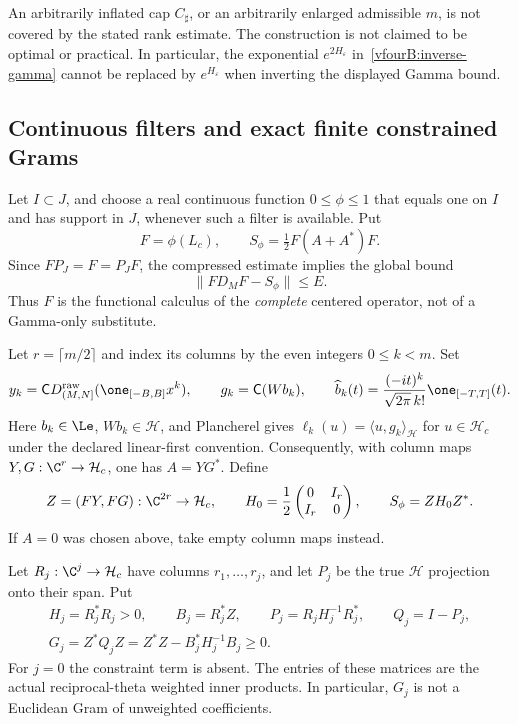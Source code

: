 \documentclass[11pt,a4paper]{article}
\numberwithin{equation}{section}
\theoremstyle{definition}\newtheorem{definition}[theorem]{Definition}
\theoremstyle{remark}\newtheorem{remark}[theorem]{Remark}
\newcommand{\Hh}{\mathcal H}\newcommand{\Hw}{\mathcal H}
\newcommand{\ip}[2]{\langle#1,#2\rangle}\newcommand{\norm}[1]{\lVert#1\rVert}\newcommand{\abs}[1]{\lvert#1\rvert}
\begin{document}
An arbitrarily inflated cap $C_\sharp$, or an arbitrarily enlarged
admissible $m$, is not covered by the stated rank estimate. The construction
is not claimed to be optimal or practical. In particular, the exponential
$e^{2H_\varepsilon}$ in~\eqref{vfourB:inverse-gamma} cannot be replaced by
$e^{H_\varepsilon}$ when inverting the displayed Gamma bound.

\subsection{Continuous filters and exact finite constrained Grams}
\label{vfourB:gram-section}

Let $I\subset J$, and choose a real continuous function $0\le\phi\le1$
that equals one on $I$ and has support in $J$, whenever such a filter is
available. Put
\begin{equation}\label{vfourB:filtered-operator}
 F=\phi(L_c),\qquad S_\phi=\tfrac12 F(A+A^*)F.
\end{equation}
Since $FP_J=F=P_JF$, the compressed estimate implies the global bound
\begin{equation}\label{vfourB:filtered-error}
 \norm{FD_MF-S_\phi}\le E.
\end{equation}
Thus $F$ is the functional calculus of the \emph{complete} centered
operator, not of a Gamma-only substitute.

Let $r=\lceil m/2\rceil$ and index its columns by the even integers
$0\le k<m$. Set
\[
 y_k=\mathsf C D_{(M,N]}^{\mathrm{raw}}
                     (\one_{[-B,B]}x^k),\qquad
 g_k=\mathsf C(Wb_k),\qquad
 \widehat b_k(t)=\frac{(-it)^k}{\sqrt{2\pi}\,k!}\one_{[-T,T]}(t).
\]
Here $b_k\in\Le$, $Wb_k\in\Hh$, and Plancherel gives
$\ell_k(u)=\ip{u}{g_k}_{\Hh}$ for $u\in\Hh_c$ under the declared
linear-first convention. Consequently, with column maps
$Y,G:\C^r\to\Hh_c$, one has $A=YG^*$. Define
\begin{equation}\label{vfourB:factorization}
 Z=(FY,FG):\C^{2r}\to\Hh_c,\qquad
 H_0=\frac12\begin{pmatrix}0&I_r\\ I_r&0\end{pmatrix},\qquad
 S_\phi=ZH_0Z^*.
\end{equation}
If $A=0$ was chosen above, take empty column maps instead.

Let $R_j:\C^j\to\Hh_c$ have columns $r_1,\ldots,r_j$, and let $P_j$
be the true $\Hh$ projection onto their span. Put
\begin{equation}\label{vfourB:constraint-gram}
 \begin{gathered}
 H_j=R_j^*R_j>0,\qquad B_j=R_j^*Z,\qquad
 P_j=R_jH_j^{-1}R_j^*,\qquad Q_j=I-P_j,\\
 G_j=Z^*Q_jZ=Z^*Z-B_j^*H_j^{-1}B_j\ge0.
 \end{gathered}
\end{equation}
For $j=0$ the constraint term is absent. The entries of these matrices
are the actual reciprocal-theta weighted inner products. In particular,
$G_j$ is not a Euclidean Gram of unweighted coefficients.
\end{document}
